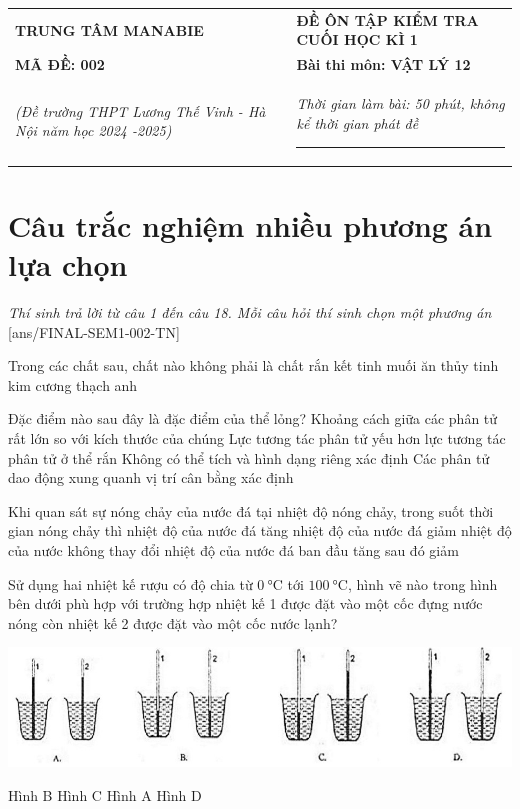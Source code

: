 \begin{tabular}{M{6.5cm}M{11cm}}
	\textbf{TRUNG TÂM MANABIE}& \textbf{ĐỀ ÔN TẬP KIỂM TRA CUỐI HỌC KÌ 1}\\
	\textbf{MÃ ĐỀ: 002}& \textbf{Bài thi môn: VẬT LÝ 12}\\
	\textit{(Đề trường THPT Lương Thế Vinh - Hà Nội năm học 2024 -2025)}& \textit{Thời gian làm bài: 50 phút, không kể thời gian phát đề}
	
	\noindent\rule{4cm}{0.8pt} \\
\end{tabular}
\setcounter{section}{0}
\section{Câu trắc nghiệm nhiều phương án lựa chọn}
\textit{Thí sinh trả lời từ câu 1 đến câu 18. Mỗi câu hỏi thí sinh chọn một phương án}
\setcounter{ex}{0}
[ans/FINAL-SEM1-002-TN]
\begin{ex}
	Trong các chất sau, chất nào không phải là chất rắn kết tinh
	\choice
	{muối ăn}
	{thủy tinh}
	{kim cương}
	{thạch anh}
	\loigiai{}
\end{ex}
\begin{ex}
	Đặc điểm nào sau đây là đặc điểm của thể lỏng?
	\choice
	{Khoảng cách giữa các phân tử rất lớn so với kích thước của chúng}
	{Lực tương tác phân tử yếu hơn lực tương tác phân tử ở thể rắn}
	{Không có thể tích và hình dạng riêng xác định}
	{Các phân tử dao động xung quanh vị trí cân bằng xác định}
	\loigiai{}
\end{ex}
\begin{ex}
	Khi quan sát sự nóng chảy của nước đá tại nhiệt độ nóng chảy, trong suốt thời gian nóng chảy thì
	\choice
	{nhiệt độ của nước đá tăng}
	{nhiệt độ của nước đá giảm}
	{nhiệt độ của nước không thay đổi}
	{nhiệt độ của nước đá ban đầu tăng sau đó giảm}
	\loigiai{}
\end{ex}
\begin{ex}
	Sử dụng hai nhiệt kế rượu có độ chia từ $\SI{0}{\celsius}$ tới $\SI{100}{\celsius}$, hình vẽ nào trong hình bên dưới phù hợp với trường hợp nhiệt kế 1 được đặt vào một cốc đựng nước nóng còn nhiệt kế 2 được đặt vào một cốc nước lạnh?
	\begin{center}
		\includegraphics[scale=0.7]{../figs/FINAL-SEM1-002-1}
	\end{center}
	\choice
	{Hình B}
	{Hình C}
	{Hình A}
	{Hình D}
	\loigiai{}
\end{ex}
